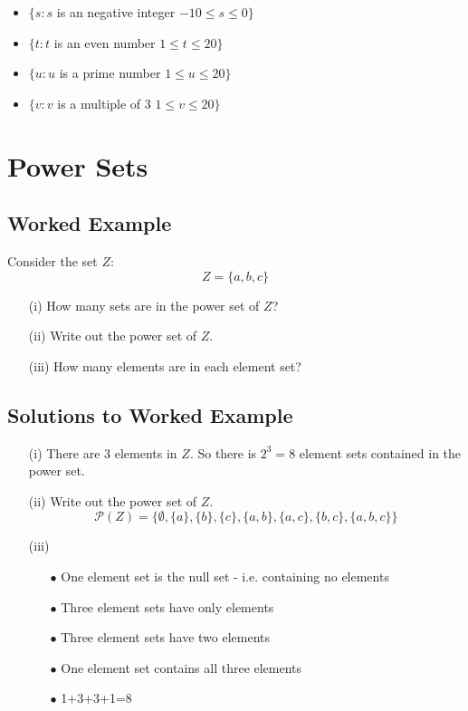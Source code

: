 \begin{itemize} 
\item $\{ s : s $ is an negative integer $ -10 \leq s \leq 0 \}$
\item $\{ t : t $ is an even number $ 1 \leq t \leq 20 \}$
\item $\{ u : u $ is a prime number $ 1 \leq u \leq 20 \}$
\item $\{ v : v $ is a multiple of 3 $ 1 \leq v \leq 20 \}$
\end{itemize}
\newpage
\section*{Power Sets}
\subsection*{Worked Example}
Consider the set $Z$:
\[ Z = \{ a,b,c\}  \]
\begin{itemize}
\item[(i)] How many sets are in the power set of $Z$? 
\item[(ii)] Write out the power set of $Z$. 
\item[(iii)] How many elements are in each element set?
\end{itemize}
\subsection*{Solutions to Worked Example}

\begin{itemize}


\item[(i)] There are 3 elements in $Z$. So there is $2^3 = 8$ element sets contained in the power set.

\item[(ii)] Write out the power set of $Z$.
\[ \mathcal{P}(Z) = \{ \emptyset, \{a\}, \{b\}, \{c\}, \{a,b\}, \{a,c\}, \{b,c\}, \{a,b,c\} \} \]

\item[(iii)]
\begin{itemize}
\item[$\bullet$] One element set is the null set - i.e. containing no
elements \item[$\bullet$] Three element sets have only elements \item[$\bullet$]
Three element sets have two elements \item[$\bullet$] One element set
contains all three elements \item[$\bullet$] 1+3+3+1=8
\end{itemize}
\end{itemize}
